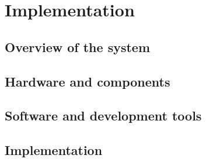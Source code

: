 \section{Implementation}%
\label{sec:implementation}

\subsection{Overview of the system}%
\label{sub:overview_of_the_system}

\subsection{Hardware and components}%
\label{sub:hardware_and_components}

\subsection{Software and development tools}%
\label{sub:software_and_development_tools}

\subsection{Implementation}%
\label{sub:implementation}
